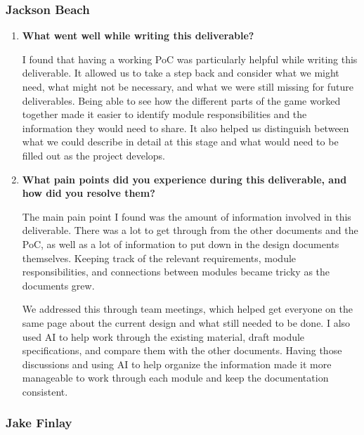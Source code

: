\documentclass[10pt, titlepage]{article}
\begin{document}
\subsubsection*{Jackson Beach}

\begin{enumerate}
\item \textbf{What went well while writing this deliverable?}

    I found that having a working PoC was particularly helpful while
    writing this deliverable. It allowed us to take a step back and
    consider what we might need, what might not be necessary, and what
    we were still missing for future deliverables. Being able to see
    how the different parts of the game worked together made it easier
    to identify module responsibilities and the information they would
    need to share. It also helped us distinguish between what we could
    describe in detail at this stage and what would need to be filled
    out as the project develops.

\item \textbf{What pain points did you experience during this deliverable,
    and how did you resolve them?}

    The main pain point I found was the amount of information involved
    in this deliverable. There was a lot to get through from the other
    documents and the PoC, as well as a lot of information to put down
    in the design documents themselves. Keeping track of the relevant
    requirements, module responsibilities, and connections between
    modules became tricky as the documents grew.

    We addressed this through team meetings, which helped get everyone
    on the same page about the current design and what still needed
    to be done. I also used AI to help work through the existing
    material, draft module specifications, and compare them with the
    other documents. Having those discussions and using AI to help
    organize the information made it more manageable to work through
    each module and keep the documentation consistent.
\end{enumerate}

\subsubsection*{Jake Finlay}
\end{document}
